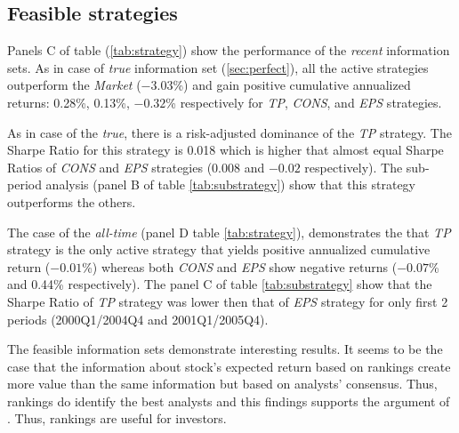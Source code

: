 \documentclass{article}\usepackage[]{graphicx}\usepackage[]{color}
\newcommand{\tr}{\textit{true}}
\newcommand{\naive}{\textit{recent}}
\newcommand{\default}{\textit{all-time}}
\begin{document}
\subsection{Feasible strategies}
Panels C of table (\ref{tab:strategy}) show the performance of the \naive{} information sets. As in case of \tr{} information set (\ref{sec:perfect}), all the active strategies outperform the \textit{Market} (\ensuremath{-3.03}\%)  and gain positive cumulative annualized returns: 0.28\%,  0.13\%, \ensuremath{-0.32}\% respectively for \textit{TP}, \textit{CONS}, and \textit{EPS} strategies.

As in case of the \tr{}, there is a risk-adjusted dominance of the \textit{TP} strategy. The Sharpe Ratio for this strategy is 0.018 which is higher that almost equal Sharpe Ratios of \textit{CONS} and \textit{EPS} strategies  (0.008 and \ensuremath{-0.02} respectively). The sub-period analysis (panel B of table \ref{tab:substrategy}) show that this strategy outperforms the others.


The case of the \default{} (panel D table \ref{tab:strategy}), demonstrates the that \textit{TP} strategy is the only active strategy that yields positive annualized cumulative return (\ensuremath{-0.01}\%) whereas both  \textit{CONS} and \textit{EPS} show negative returns (\ensuremath{-0.07}\% and 0.44\% respectively). The panel C of table \ref{tab:substrategy} show that the Sharpe Ratio of \textit{TP} strategy was lower then that of \textit{EPS} strategy for only first 2 periods (2000Q1/2004Q4 and 2001Q1/2005Q4).

The feasible information sets demonstrate interesting results. It seems to be the case that the information about stock’s expected return based on rankings create more value than the same information but based on analysts’ consensus. Thus, rankings do identify the best analysts and this findings supports the argument of \cite{desai2000ass}. Thus, rankings are useful for investors.




\end{document}
